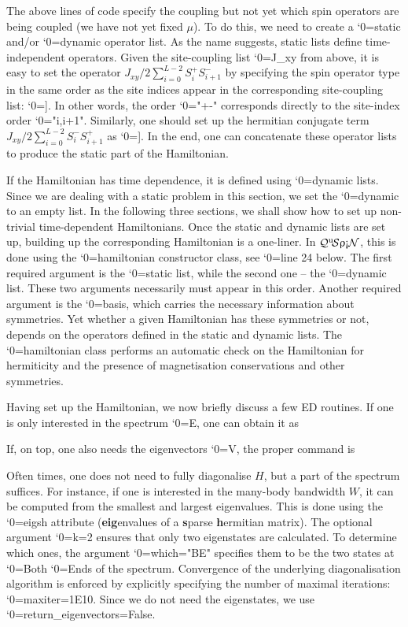 \documentclass{SciPost}
\newcommand\0{\scalebox{-1}[1]{0}}
\let\svttfamily\ttfamily
\renewcommand\ttfamily{\svttfamily\catcode`0=\active }
\renewcommand\texttt{\bgroup\ttfamily\texttthelp}
\def\texttthelp#1{#1\egroup}
\newcommand{\qspin}{$\mathcal{Q}^{\mathrm{u}}\!\mathcal{S}\uprho\mathrm{\text{\textexclamdown}}\mathcal{N}$}
\begin{document}

%
The above lines of code specify the coupling but not yet which spin operators are being coupled (we have not yet fixed $\mu$). To do this, we need to create a \texttt{static} and/or \texttt{dynamic} operator list. As the name suggests, static lists define time-independent operators. Given the site-coupling list \texttt{J\_xy} from above, it is easy to set the operator $J_{xy}/2\sum_{i=0}^{L-2}S^+_{i}S^-_{i+1}$ by specifying the spin operator type in the same order as the site indices appear in the corresponding site-coupling list: \texttt{[["+-",J\_xy]]}. In other words, the order \texttt{"+-"} corresponds directly to the site-index order \texttt{"i,i+1"}. Similarly, one should set up the hermitian conjugate term $J_{xy}/2\sum_{i=0}^{L-2}S^-_{i}S^+_{i+1}$ as \texttt{[["-+",J\_xy]]}. In the end, one can concatenate these operator lists to produce the static part of the Hamiltonian.
 
%
If the Hamiltonian has time dependence, it is defined using \texttt{dynamic} lists. Since we are dealing with a static problem in this section, we set the \texttt{dynamic} to an empty list. In the following three sections, we shall show how to set up non-trivial time-dependent Hamiltonians. 
%
Once the static and dynamic lists are set up, building up the corresponding Hamiltonian is a one-liner. In \qspin, this is done using the \texttt{hamiltonian} constructor class, see \texttt{line 24} below. The first required argument is the \texttt{static} list, while the second one -- the \texttt{dynamic} list. These two arguments necessarily must appear in this order. Another required argument is the \texttt{basis}, which carries the necessary information about symmetries. Yet whether a given Hamiltonian has these symmetries or not, depends on the operators defined in the static and dynamic lists. The \texttt{hamiltonian} class performs an automatic check on the Hamiltonian for hermiticity and the presence of magnetisation conservations and other symmetries.

% 
Having set up the Hamiltonian, we now briefly discuss a few ED routines. If one is only interested in the spectrum \texttt{E}, one can obtain it as

% 
If, on top, one also needs the eigenvectors \texttt{V}, the proper command is

%
Often times, one does not need to fully diagonalise $H$, but a part of the spectrum suffices. For instance, if one is interested in the many-body bandwidth $W$, it can be computed from the smallest and largest eigenvalues. This is done using the \texttt{eigsh} attribute ({\bf eig}envalues of a {\bf s}parse {\bf h}ermitian matrix).  The optional argument \texttt{k=2} ensures that only two eigenstates are calculated. To determine which ones, the argument \texttt{which="BE"} specifies  them to be the two states at \texttt{B}oth \texttt{E}nds of the spectrum. Convergence of the underlying diagonalisation algorithm is enforced by explicitly specifying the number of maximal iterations: \texttt{maxiter=1E10}. Since we do not need the eigenstates, we use \texttt{return\_eigenvectors=False}.
\end{document}
